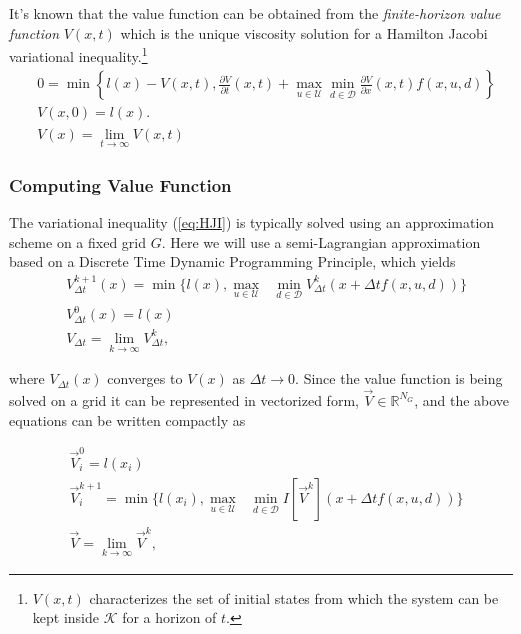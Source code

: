 \documentclass{journal}
\newcommand{\D}{\mathcal{D}}
\newcommand{\K}{\mathcal{K}}
\newcommand{\U}{\mathcal{U}}
\newcommand{\RR}{\mathbb{R}}
\begin{document}
It's known that the value function can be obtained from the \emph{finite-horizon value function} $V(x,t)$ which is the unique viscosity solution for a Hamilton Jacobi variational inequality.\footnote{$V(x,t)$ characterizes the set of initial states from which the system can be kept inside $\K$ for a horizon of $t$.
} 
\begin{subequations}\label{eq:HJI}\begin{align}
    & 0 = \min\left\{l(x)-V(x,t), \frac{\partial V}{\partial t}(x,t)+ \max_{u\in\U} \min_{ d\in\D} \!\!\frac{\partial V}{\partial x}(x,t) f(x,u, d)\right\}\label{eq:HJIa}\\
    &V(x,0) = l(x).\label{eq:HJIb}\\
    &V(x) = \lim_{t \rightarrow \infty} V(x,t)
\end{align}\end{subequations}




\subsubsection{Computing Value Function}

The variational inequality (\ref{eq:HJI}) is typically solved using an approximation scheme on a fixed grid $G$. Here we will use a semi-Lagrangian approximation based on a Discrete Time Dynamic Programming Principle, which yields
\begin{subequations}
\begin{align}
&V_{\Delta t}^{k+1}(x) = \min\{l(x),  \underset{u\in\U}{\max}\text{ }\underset{ d\in\D}{\min} V^{k}_{\Delta t}(x+\Delta t f(x,u,d))\}\\
&V_{\Delta t}^{0}(x) = l(x)\\
&V_{\Delta t} = \lim_{k\rightarrow \infty} V^{k}_{\Delta t},
\end{align}
\end{subequations}

\noindent where $V_{\Delta t}(x)$ converges to $V(x)$ as $\Delta t \rightarrow 0$. Since the value function is being solved on a grid it can be represented in vectorized form, $\vec{V} \in \RR^{N_G}$, and the above equations can be written compactly as

\begin{subequations} \label{eq:dp_min_dist}
\begin{align}
&\vec{V}_{i}^{0} = l(x_i)\\
&\vec{V}_{i}^{k+1} = \min\{l(x_i),  \underset{u\in\U}{\max}\text{ }\underset{ d\in\D}{\min} I[\vec{V}^{k}](x+\Delta t f(x,u,d)) \label{eq:dp_min_dist_b}\}\\
&\vec{V} = \lim_{k\rightarrow \infty} \vec{V}^{k},
\end{align}
\end{subequations}
\end{document}

